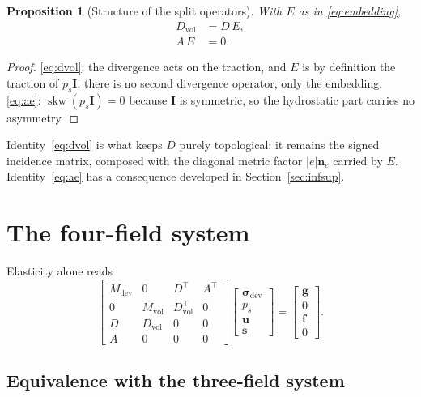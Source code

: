 \documentclass[11pt,a4paper]{article}
\newcommand{\dev}{\mathrm{dev}}
\newcommand{\skw}{\operatorname{skw}}
\newcommand{\bsig}{\boldsymbol{\sigma}}
\newcommand{\bu}{\boldsymbol{u}}
\newcommand{\bn}{\boldsymbol{n}}
\newcommand{\bI}{\boldsymbol{I}}
\theoremstyle{plain}
\newtheorem{proposition}{Proposition}
\theoremstyle{remark}
\begin{document}
\begin{proposition}[Structure of the split operators]
\label{prop:identities}
With $E$ as in \eqref{eq:embedding},
\begin{align}
  D_{\mathrm{vol}} &= D\,E , \label{eq:dvol}\\
  A\,E &= 0 . \label{eq:ae}
\end{align}
\end{proposition}

\begin{proof}
\eqref{eq:dvol}: the divergence acts on the traction, and $E$ is by definition
the traction of $p_s\bI$; there is no second divergence operator, only the
embedding. \eqref{eq:ae}: $\skw(p_s\bI)=0$ because $\bI$ is symmetric, so the
hydrostatic part carries no asymmetry.
\end{proof}

Identity~\eqref{eq:dvol} is what keeps $D$ purely topological: it remains the
signed incidence matrix, composed with the diagonal metric factor $|e|\bn_e$
carried by $E$. Identity~\eqref{eq:ae} has a consequence developed in
Section~\ref{sec:infsup}.

\section{The four-field system}

Elasticity alone reads
\begin{equation}
  \begin{bmatrix}
    M_{\dev} & 0 & D^{\!\top} & A^{\!\top}\\
    0 & M_{\mathrm{vol}} & D_{\mathrm{vol}}^{\!\top} & 0\\
    D & D_{\mathrm{vol}} & 0 & 0\\
    A & 0 & 0 & 0
  \end{bmatrix}
  \begin{bmatrix}\bsig_{\dev}\\ p_s\\ \bu\\ \boldsymbol{s}\end{bmatrix}
  =
  \begin{bmatrix}\boldsymbol{g}\\ 0\\ \boldsymbol{f}\\ 0\end{bmatrix}.
  \label{eq:fourfield}
\end{equation}

\subsection{Equivalence with the three-field system}
\end{document}
